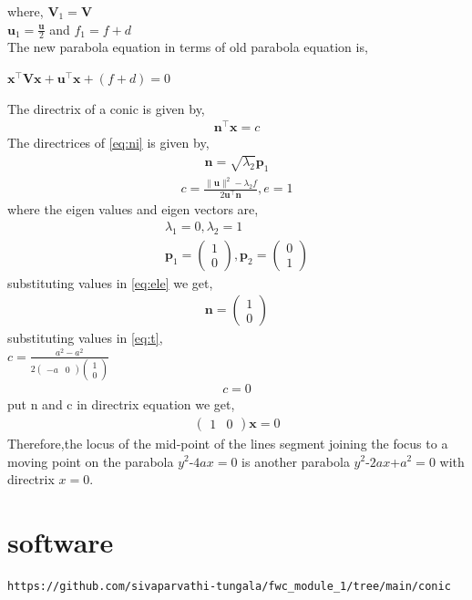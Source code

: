 \documentclass[journal,12pt,twocolumn]{IEEEtran}
\newcommand{\myvec}[1]{\ensuremath{\begin{pmatrix}#1\end{pmatrix}}}
\let\vec\mathbf
\begin{document}
where,
$\vec{V}_{1}=\vec{V}$\\ 
$\vec{u}_{1}=\frac{\vec{u}}{2}$ and $f_1=f+d$ \\
The new parabola equation in terms of old parabola equation is,\\
\begin{center}
$\vec{x}^\top\vec{V}\vec{x}+\vec{u}^\top\vec{x}+(f+d)=0$
\end{center}
The directrix of a conic is given by,
\begin{align}
\label{eq:te}
\vec{n}^\top\vec{x}=c
\end{align}
The directrices of \eqref{eq:ni} is given by,\\
\begin{align}
\label{eq:ele}
\vec{n}=\sqrt{\lambda_2}\vec{p}_{1}
\end{align}
\begin{align}
\label{eq:t}
c=\frac{\|\vec{u}\|^2-\lambda_2 f}{2\vec{u}^\top\vec{n}} , e=1
\end{align}
where the eigen values and eigen vectors are,\\
\begin{align}
\label{eq:twe}
\lambda_1=0 , \lambda_2=1\\
\vec{p}_{1}=\myvec{1\\0}, \vec{p}_{2}=\myvec{0\\1} 
\end{align}
substituting values in \eqref{eq:ele} we get,\\
\begin{align}
\label{eq:thir}
\vec{n}=\myvec{1\\0}
\end{align}
substituting values in \eqref{eq:t},\\
$c=\frac{a^2-a^2}{2\myvec{-a & 0}\myvec{1\\0}}$\\
\begin{align}
\label{eq:fourteen}
c=0
\end{align}
put n and c in directrix equation we get,
\begin{align}
\label{eq:fif}
\myvec{1&0}\vec{x}=0
\end{align}
        Therefore,the locus of the mid-point of the lines segment joining the focus to a moving point on the parabola $y^2$-$4ax=0$ is another parabola $y^2$-$2ax$+$a^2=0$ with directrix $x=0$.\\



\section{\textbf{software}}
\begin{lstlisting}
https://github.com/sivaparvathi-tungala/fwc_module_1/tree/main/conic
\end{lstlisting}
\end{document}
